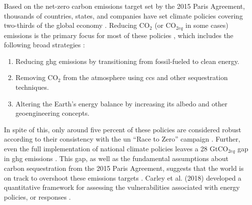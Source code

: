    \noindent\hrulefill
    
    Based on the net-zero carbon emissions target set by the 2015 Paris Agreement, thousands of countries, states, and companies have set climate policies covering two-thirds of the global economy \cite{hale_assessing_2022}. Reducing CO$_2$ (or CO$_{2eq}$ in some cases) emissions is the primary focus for most of these policies \cite{fawzy_strategies_2020, roelfsema_taking_2020, hale_assessing_2022}, which includes the following broad strategies \cite{fawzy_strategies_2020}:
    \begin{enumerate}
        \item Reducing \ac{ghg} emissions by transitioning from fossil-fueled to clean energy.
        \item Removing CO$_2$ from the atmosphere using \ac{ccs} and other sequestration techniques.
        \item Altering the Earth's energy balance by increasing its albedo and other geoengineering concepts.
    \end{enumerate}
    
    In spite of this, only around five percent of these policies are considered
    robust according to their consistency with the \ac{un} ``Race to Zero'' campaign \cite{hale_assessing_2022}. Further, even the full implementation of national climate
    policies leaves a 28 GtCO$_{2eq}$ gap in \ac{ghg} emissions \cite{roelfsema_taking_2020}. 
    This gap, as well as the fundamental assumptions about carbon sequestration from the 2015 Paris 
    Agreement, suggests that the world is on track to overshoot these emissions targets 
    \cite{roelfsema_taking_2020,taylor_managing_2021}. Carley et al. (2018) developed a quantitative framework for assessing the vulnerabilities associated with energy policies, or responses \cite{carley_framework_2018}.
    
    \noindent\hrulefill

